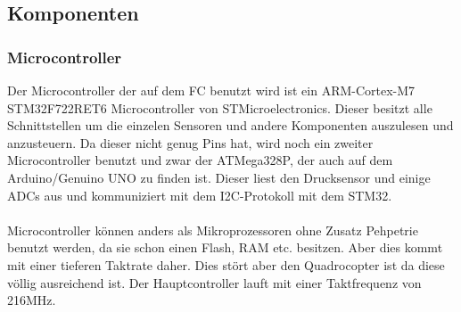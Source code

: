 \documentclass[12pt,a4paper, ngerman]{article}
\begin{document}
\subsection{Komponenten}
\subsubsection{Microcontroller}
Der Microcontroller der auf dem FC benutzt wird ist ein ARM-Cortex-M7 STM32F722RET6 Microcontroller von STMicroelectronics. Dieser besitzt alle Schnittstellen um die einzelen Sensoren und andere Komponenten auszulesen und anzusteuern. Da dieser nicht genug Pins hat, wird noch ein zweiter Microcontroller benutzt und zwar der ATMega328P, der auch auf dem Arduino/Genuino UNO zu finden ist. Dieser liest den Drucksensor und einige ADCs aus und kommuniziert mit dem I2C-Protokoll mit dem STM32. \\ \\
Microcontroller können anders als Mikroprozessoren ohne Zusatz Pehpetrie benutzt werden, da sie schon einen Flash, RAM etc. besitzen. Aber dies kommt mit einer tieferen Taktrate daher. Dies stört aber den Quadrocopter ist da diese völlig ausreichend ist. Der Hauptcontroller lauft mit einer Taktfrequenz von 216MHz.
\end{document}

